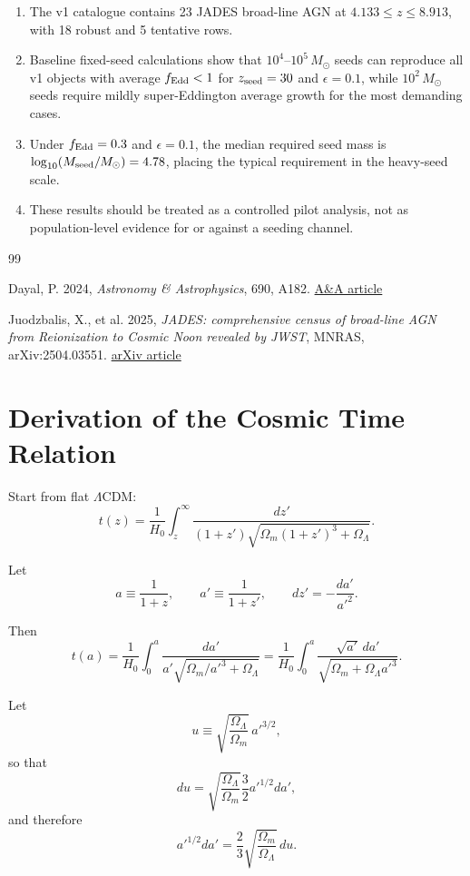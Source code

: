 \documentclass[letterpaper,12pt]{article}
\begin{document}
\begin{enumerate}
    \item The v1 catalogue contains 23 JADES broad-line AGN at $4.133 \leq z \leq 8.913$, with 18 robust and 5 tentative rows.
    \item Baseline fixed-seed calculations show that $10^4$--$10^5\,M_\odot$ seeds can reproduce all v1 objects with average $f_{\rm Edd}<1$ for $z_{\rm seed}=30$ and $\epsilon=0.1$, while $10^2\,M_\odot$ seeds require mildly super-Eddington average growth for the most demanding cases.
    \item Under $f_{\rm Edd}=0.3$ and $\epsilon=0.1$, the median required seed mass is $\log_{10}(M_{\rm seed}/M_\odot)=4.78$, placing the typical requirement in the heavy-seed scale.
    \item These results should be treated as a controlled pilot analysis, not as population-level evidence for or against a seeding channel.
\end{enumerate}

\begin{thebibliography}{99}

Dayal, P. 2024,
\textit{Astronomy \& Astrophysics}, 690, A182.
\href{https://www.aanda.org/articles/aa/full_html/2024/10/aa51481-24/aa51481-24.html}{A\&A article}

Juodzbalis, X., et al. 2025,
\textit{JADES: comprehensive census of broad-line AGN from Reionization to Cosmic Noon revealed by JWST},
MNRAS, arXiv:2504.03551.
\href{https://arxiv.org/abs/2504.03551}{arXiv article}

\end{thebibliography}

\appendix

\section{Derivation of the Cosmic Time Relation}

Start from flat $\Lambda$CDM:
\[
t(z)=\frac{1}{H_0}\int_z^\infty
\frac{dz'}{(1+z')\sqrt{\Omega_m(1+z')^3+\Omega_\Lambda}}.
\]

Let
\[
a\equiv \frac{1}{1+z},\qquad a'\equiv \frac{1}{1+z'},\qquad
dz'=-\frac{da'}{a'^2}.
\]

Then
\[
t(a)=\frac{1}{H_0}\int_0^a
\frac{da'}{a'\sqrt{\Omega_m/a'^3+\Omega_\Lambda}}
=
\frac{1}{H_0}\int_0^a
\frac{\sqrt{a'}\,da'}{\sqrt{\Omega_m+\Omega_\Lambda a'^3}}.
\]

Let
\[
u\equiv \sqrt{\frac{\Omega_\Lambda}{\Omega_m}}\,a'^{3/2},
\]
so that
\[
du=\sqrt{\frac{\Omega_\Lambda}{\Omega_m}}\frac{3}{2}a'^{1/2}da',
\]
and therefore
\[
a'^{1/2}da'=\frac{2}{3}\sqrt{\frac{\Omega_m}{\Omega_\Lambda}}\,du.
\]
\end{document}
